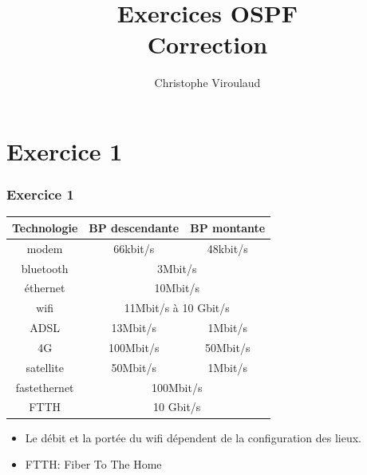 \documentclass[svgnames,11pt]{beamer}
\author[]{Christophe Viroulaud}
\title{Exercices OSPF\\Correction}
\date{\framebox{\textbf{Archi 14}}}
\institute{Terminale - NSI}
\begin{document}
\begin{frame}
\titlepage
\end{frame}
\section{Exercice 1}
\begin{frame}
    \frametitle{Exercice 1}

    \begin{center}
        \begin{tabular}{|*{3}{c|}}
            \hline
            Technologie & BP descendante & BP montante \\
            \hline
            modem & 66kbit/s & 48kbit/s\\
            \hline
            bluetooth & \multicolumn{2}{c|}{3Mbit/s}\\
            \hline
            éthernet & \multicolumn{2}{c|}{10Mbit/s}\\
            \hline
            wifi & \multicolumn{2}{c|}{11Mbit/s à 10 Gbit/s}\\
            \hline
            ADSL & 13Mbit/s & 1Mbit/s\\
            \hline
            4G & 100Mbit/s & 50Mbit/s\\
            \hline
            satellite & 50Mbit/s & 1Mbit/s\\
            \hline
            fastethernet & \multicolumn{2}{c|}{100Mbit/s}\\
            \hline
            FTTH & \multicolumn{2}{c|}{10 Gbit/s}\\
            \hline
        \end{tabular}
    \end{center}
    \begin{aretenir}[Remarque]
    \begin{itemize}
        \item Le débit et la portée du wifi dépendent de la configuration des lieux.
        \item FTTH: Fiber To The Home
    \end{itemize}
    \end{aretenir}

\end{frame}
\end{document}
